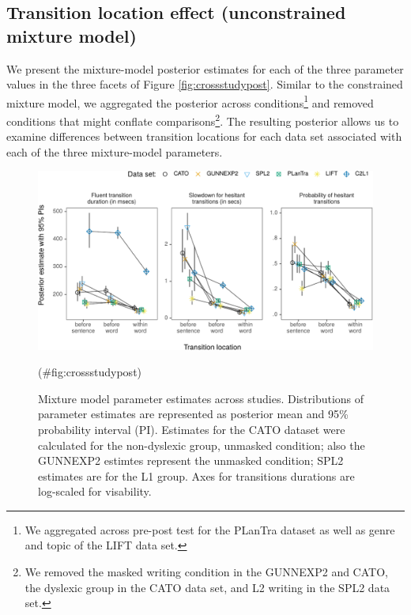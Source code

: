 \clearpage
\makeatletter
\efloat@restorefloats
\makeatother


\begin{appendix}
\section{}
\hypertarget{transition-location-effect-unconstrained-mixture-model}{%
\subsection{Transition location effect (unconstrained mixture
model)}\label{transition-location-effect-unconstrained-mixture-model}}

We present the mixture-model posterior estimates for each of the three
parameter values in the three facets of Figure \ref{fig:crossstudypost}.
Similar to the constrained mixture model, we aggregated the posterior
across conditions\footnote{We aggregated across pre-post test for the
  PLanTra dataset as well as genre and topic of the LIFT data set.} and
removed conditions that might conflate comparisons\footnote{We removed
  the masked writing condition in the GUNNEXP2 and CATO, the dyslexic
  group in the CATO data set, and L2 writing in the SPL2 data set.}. The
resulting posterior allows us to examine differences between transition
locations for each data set associated with each of the three
mixture-model parameters.

\begin{figure}

{\centering \includegraphics{manuscript_files/figure-latex/crossstudypost-1} 

}

\caption{Mixture model parameter estimates across studies. Distributions of parameter estimates are represented as posterior mean and 95\% probability interval (PI). Estimates for the CATO dataset were calculated for the non-dyslexic group, unmasked condition; also the GUNNEXP2 estimtes represent the unmasked condition; SPL2 estimates are for the L1 group. Axes for transitions durations are log-scaled for visability.}(\#fig:crossstudypost)
\end{figure}


\end{appendix}
